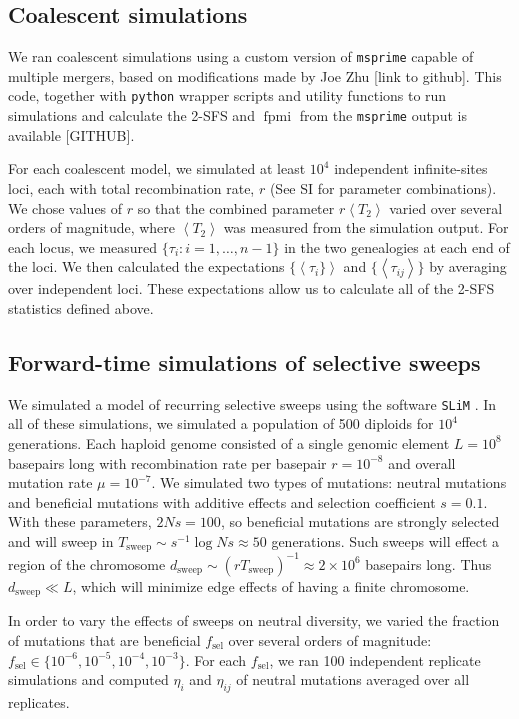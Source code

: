 \documentclass[11pt, letterpaper]{article}   	%
\newcommand{\E}[1]{\left< #1 \right>}
\DeclareMathOperator{\fpmi}{fpmi}
\begin{document}
\subsection*{Coalescent simulations}

We ran coalescent simulations using a custom version of \texttt{msprime} \autocite{KelleherEtAl2014} capable of multiple mergers, based on modifications made by Joe Zhu [link to github].
This code, together with \texttt{python} wrapper scripts and utility functions to run simulations and calculate the 2-SFS and $\fpmi$ from the \texttt{msprime} output is available [GITHUB].

For each coalescent model, we simulated at least $10^4$ independent infinite-sites loci, each with total recombination rate, $r$ (See SI for parameter combinations).
We chose values of $r$ so that the combined parameter $r\E{T_2}$ varied over several orders of magnitude, where $\E{T_2}$ was measured from the simulation output.
For each locus, we measured $\{\tau_i : i = 1,\ldots,n-1\}$ in the two genealogies at each end of the loci.
We then calculated the expectations $\{\E{\tau_i\}}$ and $\{\E{\tau_{ij}}\}$ by averaging over independent loci.
These expectations allow us to calculate all of the 2-SFS statistics defined above.

\subsection*{Forward-time simulations of selective sweeps}

We simulated a model of recurring selective sweeps using the software \texttt{SLiM} \autocite{MesserEtAl201?}.
In all of these simulations, we simulated a population of 500 diploids for $10^4$ generations.
Each haploid genome consisted of a single genomic element $L=10^8$ basepairs long with recombination rate per basepair $r = 10^{-8}$ and overall mutation rate $\mu = 10^{-7}$.
We simulated two types of mutations: neutral mutations and beneficial mutations with additive effects and selection coefficient $s=0.1$.
With these parameters, $2Ns = 100$, so beneficial mutations are strongly selected and will sweep in $T_{\text{sweep}}\sim s^{-1} \log Ns \approx 50$ generations.
Such sweeps will effect a region of the chromosome $d_{\text{sweep}} \sim (r T_{\text{sweep}})^{-1} \approx 2 \times 10^6$ basepairs long.
Thus $d_{\text{sweep}} \ll L$, which will minimize edge effects of having a finite chromosome.

In order to vary the effects of sweeps on neutral diversity, we varied the fraction of mutations that are beneficial $f_{\text{sel}}$ over several orders of magnitude: $f_{\text{sel}} \in \{10^{-6}, 10^{-5}, 10^{-4}, 10^{-3}\}$.
For each $f_{\text{sel}}$, we ran 100 independent replicate simulations and computed $\eta_i$ and $\eta_{ij}$ of neutral mutations averaged over all replicates.
\end{document}
